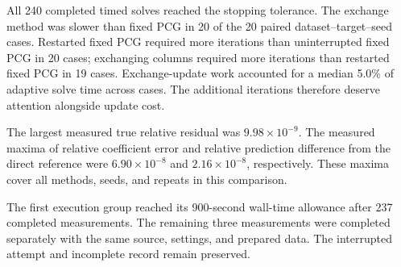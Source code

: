 All 240 completed timed solves reached the stopping tolerance. The exchange method was slower than fixed PCG in 20 of the 20 paired dataset--target--seed cases. Restarted fixed PCG required more iterations than uninterrupted fixed PCG in 20 cases; exchanging columns required more iterations than restarted fixed PCG in 19 cases. Exchange-update work accounted for a median 5.0\% of adaptive solve time across cases. The additional iterations therefore deserve attention alongside update cost.

The largest measured true relative residual was $9.98\times 10^{-9}$. The measured maxima of relative coefficient error and relative prediction difference from the direct reference were $6.90\times 10^{-8}$ and $2.16\times 10^{-8}$, respectively. These maxima cover all methods, seeds, and repeats in this comparison.

The first execution group reached its 900-second wall-time allowance after 237 completed measurements. The remaining three measurements were completed separately with the same source, settings, and prepared data. The interrupted attempt and incomplete record remain preserved.
